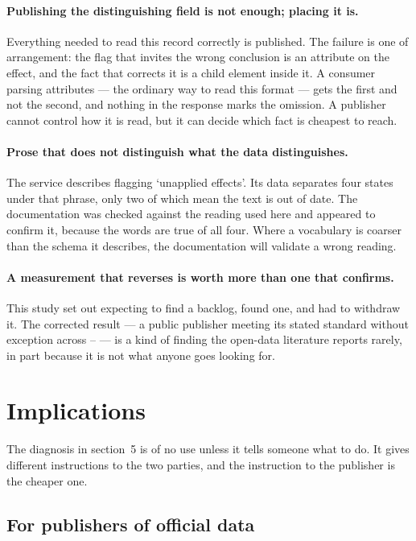 \documentclass[11pt]{article}
\begin{document}
\paragraph{Publishing the distinguishing field is not enough; placing it is.}
Everything needed to read this record correctly is published. The failure is
one of arrangement: the flag that invites the wrong conclusion is an attribute
on the effect, and the fact that corrects it is a child element inside it. A
consumer parsing attributes --- the ordinary way to read this format --- gets
the first and not the second, and nothing in the response marks the omission.
A publisher cannot control how it is read, but it can decide which fact is
cheapest to reach.

\paragraph{Prose that does not distinguish what the data distinguishes.} The
service describes flagging `unapplied effects'. Its data separates four states
under that phrase, only two of which mean the text is out of date. The
documentation was checked against the reading used here and appeared to confirm
it, because the words are true of all four. Where a vocabulary is coarser than
the schema it describes, the documentation will validate a wrong reading.

\paragraph{A measurement that reverses is worth more than one that confirms.}
This study set out expecting to find a backlog, found one, and had to withdraw
it. The corrected result --- a public publisher meeting its stated standard
without exception across \nYearFrom{}--\nYearTo{} --- is a kind of finding the
open-data literature reports rarely, in part because it is not what anyone goes
looking for.

\section{Implications}

The diagnosis in section~5 is of no use unless it tells someone what to do. It
gives different instructions to the two parties, and the instruction to the
publisher is the cheaper one.

\subsection{For publishers of official data}
\end{document}
